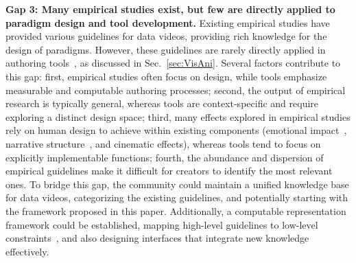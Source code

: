 \textbf{Gap 3: Many empirical studies exist, but few are directly applied to paradigm design and tool development.}
Existing empirical studies have provided various guidelines for data videos, providing rich knowledge for the design of paradigms.
However, these guidelines are rarely directly applied in authoring tools~\cite{Chen2022}, as discussed in Sec.~\ref{sec:VisAni}. 
Several factors contribute to this gap: 
first, empirical studies often focus on design, while tools emphasize measurable and computable authoring processes; 
second, the output of empirical research is typically general, whereas tools are context-specific and require exploring a distinct design space; 
third, many effects explored in empirical studies rely on human design to achieve within existing components (\eg emotional impact~\cite{Lan2023, Lan2022}, narrative structure~\cite{Lan2021a, Yang2022a, Wei2024}, and cinematic effects\cite{Xu2022, Xu2023b}), whereas tools tend to focus on explicitly implementable functions; 
fourth, the abundance and dispersion of empirical guidelines make it difficult for creators to identify the most relevant ones.
To bridge this gap, the community could maintain a unified knowledge base for data videos, categorizing the existing guidelines, and potentially starting with the framework proposed in this paper. 
Additionally, a computable representation framework could be established, mapping high-level guidelines to low-level constraints~\cite{dataplayer}, and also designing interfaces that integrate new knowledge effectively.

